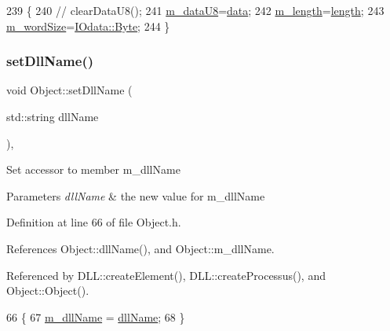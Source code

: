 \begin{DoxyCode}
239                                       \{
240 \textcolor{comment}{//    clearDataU8();}
241     \hyperlink{classIOdata_a9c4c0dc5104f7f3b170e30ab78fe61e7}{m\_dataU8}=\hyperlink{namespaceshell_a5ea2525995cedc3efd69ea8a7f034d1e}{data};
242     \hyperlink{classIOdata_afabe57441da019eb614d277799106aac}{m\_length}=\hyperlink{classIOdata_abb40e71ce0290832a24857b4a1e7b1a3}{length};
243     \hyperlink{classIOdata_a719b0ce607ada4fa91b12d6ecfa1b4c9}{m\_wordSize}=\hyperlink{classIOdata_a37c53ebf4bf8d866aac8af572962a84ca00156611f08eeb1b5d361de809dafb8e}{IOdata::Byte};
244   \}
\end{DoxyCode}
\mbox{\label{classObject_a870c5af919958c2136623b2d7816d123}} 
\subsubsection{\texorpdfstring{set\+Dll\+Name()}{setDllName()}}
{\footnotesize\ttfamily void Object\+::set\+Dll\+Name (\begin{DoxyParamCaption}\item[{std\+::string}]{dll\+Name }\end{DoxyParamCaption})\hspace{0.3cm}{\ttfamily [inline]}, {\ttfamily [inherited]}}

Set accessor to member m\+\_\+dll\+Name 
\begin{DoxyParams}{Parameters}
{\em dll\+Name} & the new value for m\+\_\+dll\+Name \\
\hline
\end{DoxyParams}


Definition at line 66 of file Object.\+h.



References Object\+::dll\+Name(), and Object\+::m\+\_\+dll\+Name.



Referenced by D\+L\+L\+::create\+Element(), D\+L\+L\+::create\+Processus(), and Object\+::\+Object().


\begin{DoxyCode}
66                                       \{
67     \hyperlink{classObject_a01afbeacebb8db6831559972ec362eb3}{m\_dllName} = \hyperlink{classObject_a2e3947f2870094c332d7454117f3ec63}{dllName};
68   \}
\end{DoxyCode}
\mbox{\label{classIOdata_a9a850f401542d416adf061e30f7dfdd5}} 
